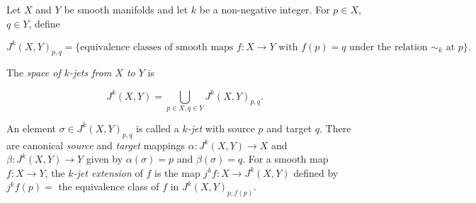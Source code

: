 Let $X$ and $Y$ be smooth manifolds and let $k$ be a non-negative integer. For $p \in X$, $q \in Y$, define

$$J^k(X, Y)_{p,q} = \{ \text{equivalence classes of smooth maps } f: X \to Y \text{ with } f(p) = q \text{ under the relation } \sim_k \text{ at } p \}.$$

The \textit{space of $k$-jets from $X$ to $Y$} is

$$J^k(X, Y) = \bigcup_{p \in X, q \in Y} J^k(X, Y)_{p,q}.$$

An element $\sigma \in J^k(X, Y)_{p,q}$ is called a \textit{$k$-jet} with source $p$ and target $q$. There are canonical \textit{source} and \textit{target} mappings $\alpha: J^k(X, Y) \to X$ and $\beta: J^k(X, Y) \to Y$ given by $\alpha(\sigma) = p$ and $\beta(\sigma) = q$. For a smooth map $f: X \to Y$, the \textit{$k$-jet extension} of $f$ is the map $j^k f: X \to J^k(X, Y)$ defined by $j^k f(p) =$ the equivalence class of $f$ in $J^k(X, Y)_{p, f(p)}$.
